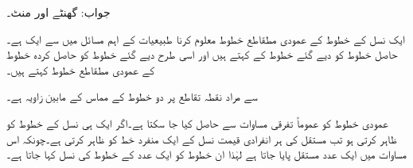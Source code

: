 جواب: گھنٹے اور  منٹ۔

ایک نسل کے خطوط کے عمودی مطقاطع خطوط معلوم کرنا طبیعیات کے اہم مسائل میں سے ایک ہے۔حاصل خطوط کو دیے گئے خطوط کے  کہتے ہیں اور اسی طرح دیے گئے خطوط کو حاصل کردہ خطوط کے عمودی مطقاطع خطوط کہتے ہیں۔

 سے مراد نقطہ تقاطع پر دو خطوط کے مماس کے مابین زاویہ ہے۔

عمودی خطوط کو عموماً تفرقی مساوات سے حاصل کیا جا سکتا ہے۔اگر   ایک ہی نسل کے خطوط کو ظاہر کرتی ہو تب مستقل  کی ہر انفرادی قیمت نسل کے ایک منفرد خط کو ظاہر کرتی ہے۔چونکہ اس مساوات میں ایک عدد مستقل  پایا جاتا ہے لہٰذا ان خطوط کو ایک عدد  کے خطوط کی نسل کہا جاتا ہے۔

